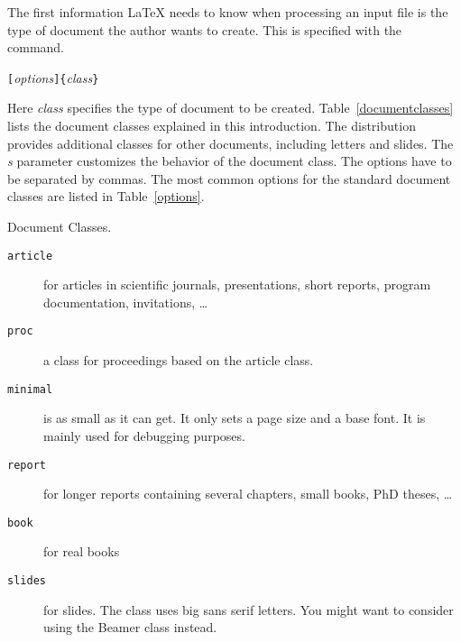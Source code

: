 The first information \LaTeX{} needs to know when processing an
input file is the type of document the author wants to create. This
is specified with the  command.
\begin{lscommand}
  \verb|[|\emph{options}\verb|]{|\emph{class}\verb|}|
\end{lscommand}
\noindent Here \emph{class} specifies the type of document to be created.
Table~\ref{documentclasses} lists the document classes explained in
this introduction. The \LaTeXe{} distribution provides additional
classes for other documents, including letters and slides.  The
\emph{s} parameter customizes the behavior of the document
class. The options have to be separated by commas. The most common options for the standard document
classes are listed in
Table~\ref{options}.


\begin{table}[!bp]
  \caption{Document Classes.}\label{documentclasses}
  \begin{lined}{\textwidth}
    \begin{description}

      \item [\normalfont\texttt{article}] for articles in scientific journals, presentations,
            short reports, program documentation, invitations, \ldots
      \item [\normalfont\texttt{proc}] a class for proceedings based on the article class.
      \item [\normalfont\texttt{minimal}] is as small as it can get.
            It only sets a page size and a base font. It is mainly used for debugging
            purposes.
      \item [\normalfont\texttt{report}] for longer reports containing several chapters, small
            books, PhD theses, \ldots
      \item [\normalfont\texttt{book}] for real books
      \item [\normalfont\texttt{slides}] for slides. The class uses big sans serif
            letters. You might want to consider using the Beamer class instead.
    \end{description}
  \end{lined}
\end{table}

